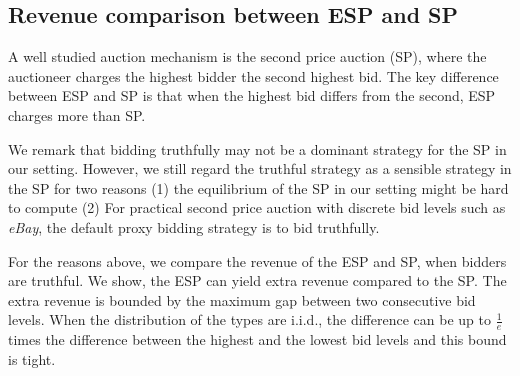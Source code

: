 \documentclass[letterpaper]{article}
\begin{document}
\subsection{Revenue comparison between ESP and SP}

A well studied auction mechanism is the second price auction (SP), where the auctioneer charges the highest bidder the second highest bid.
The key difference between ESP and SP is that when the highest bid differs from the second, ESP charges more than SP.

We remark that bidding truthfully may not be a dominant strategy for the SP in our setting.
However, we still regard the truthful strategy as a sensible strategy in the SP for two reasons (1) the equilibrium of the SP in our setting might be hard to compute (2) For practical second price auction with discrete bid levels such as {\em eBay}, the default proxy bidding strategy is to bid truthfully.

For the reasons above, we compare the revenue of the ESP and SP, when bidders are truthful. We show, the ESP can yield extra revenue compared to the SP.
The extra revenue is bounded by the maximum gap between two consecutive bid levels.
When the distribution of the types are i.i.d., the difference can be up to $\frac{1}{e}$ times the difference between the highest and the lowest bid levels and this bound is tight.
\end{document}
